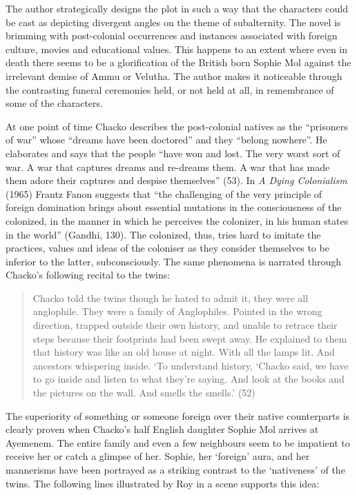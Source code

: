 The author strategically designs the plot in such a way that the characters could be cast as depicting divergent angles on the theme of subalternity. The novel is brimming with post-colonial occurrences and instances associated with foreign culture, movies and educational values. This happens to an extent where even in death there seems to be a glorification of the British born Sophie Mol against the irrelevant demise of Ammu or Velutha. The author makes it noticeable through the contrasting funeral ceremonies held, or not held at all, in remembrance of some of the characters. 

At one point of time Chacko describes the post-colonial natives as the “prisoners of war” whose “dreams have been doctored” and they “belong nowhere”. He elaborates and says that the people “have won and lost. The very worst sort of war. A war that captures dreams and re-dreams them. A war that has made them adore their captures and despise themselves” (53). In \emph{A Dying Colonialism} (1965) Frantz Fanon suggests that “the challenging of the very principle of foreign domination brings about essential mutations in the consciousness of the colonized, in the manner in which he perceives the colonizer, in his human states in the world” (Gandhi, 130). The colonized, thus, tries hard to imitate the practices, values and ideas of the coloniser as they consider themselves to be inferior to the latter, subconsciously. The same phenomena is narrated through Chacko’s following recital to the twins:

\begin{quote}
  Chacko told the twins though he hated to admit it, they were all anglophile. They were a family of Anglophiles. Pointed in the wrong direction, trapped outside their own history, and unable to retrace their steps because their footprints had been swept away. He explained to them that history was like an old house at night. With all the lamps lit. And ancestors whispering inside. ‘To understand history, ‘Chacko said, we have to go inside and listen to what they’re saying. And look at the books and the pictures on the wall. And smells the smells.’ (52)
\end{quote}

The superiority of something or someone foreign over their native counterparts is clearly proven when Chacko’s half English daughter Sophie Mol arrives at Ayemenem. The entire family and even a few neighbours seem to be impatient to receive her or catch a glimpse of her. Sophie, her ‘foreign’ aura, and her mannerisms have been portrayed as a striking contrast to the ‘nativeness’ of the twins. The following lines illustrated by Roy in a scene supports this idea:

